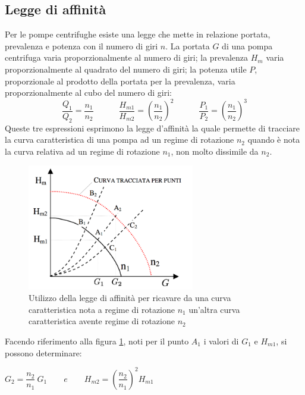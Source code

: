 \documentclass[laurea,oneside,11pt]{USiena_tesiLM}
\begin{document}
\subsection{Legge di affinità}
Per le pompe centrifughe esiste una legge che mette in relazione portata, prevalenza e potenza con il numero di giri $n$.
La portata $G$ di una pompa centrifuga varia proporzionalmente al numero di giri; la prevalenza $H_m$ varia proporzionalmente al quadrato del numero di giri; la potenza utile $P$, proporzionale al prodotto della portata per la prevalenza, varia proporzionalmente al cubo del numero di giri:
\begin{equation}
\frac{Q_1}{Q_2}=\frac{n_1}{n_2} \quad \qquad  \frac{H_{m1}}{H_{m2}}=\left( \frac{n_1}{n_2}\right)^2 \quad \qquad  \frac{P_1}{P_2}=\left( \frac{n_1}{n_2}\right)^3
\end{equation}
Queste tre espressioni esprimono la legge d'affinità la quale permette di tracciare la curva caratteristica di una pompa ad un regime di rotazione $n_2$ quando è nota la curva relativa ad un regime di rotazione $n_1$, non molto dissimile da $n_2$.

\begin{figure}[!ht]
\centering
\includegraphics[width=0.65\textwidth]{figure/affinita} 
\caption{Utilizzo della legge di affinità per ricavare da una curva caratteristica nota a regime di rotazione $n_1$ un'altra curva caratteristica avente regime di rotazione $n_2$}
\label{fig:affinita}
\end{figure}

Facendo riferimento alla figura \ref{fig:affinita}, noti per il punto $A_1$ i valori di $G_1$ e $H_{m1}$, si possono determinare:

\begin{center}
$G_2 = \dfrac{n_2}{n_1} \ G_1 \qquad e \qquad H_{m2} = \left( \dfrac{n_2}{n_1}\right)^2  H_{m1}$
\end{center}
\end{document}
